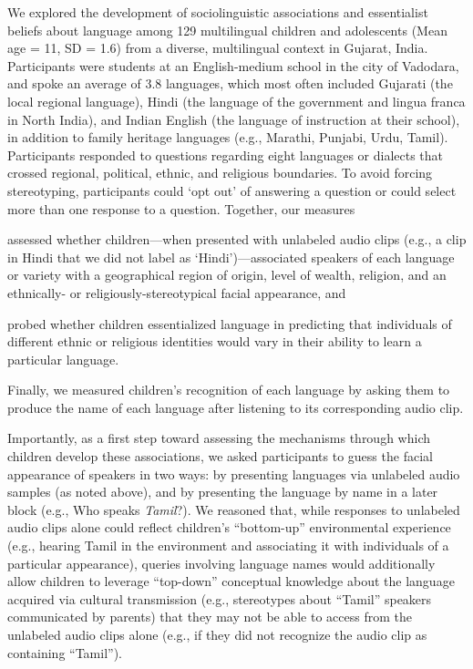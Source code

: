 \documentclass{foushee-adapted-preprint}
\begin{document}
We explored the development of sociolinguistic associations and essentialist beliefs about language among 129 multilingual children and adolescents (Mean age = 11, SD = 1.6) from a diverse, multilingual context in Gujarat, India. Participants were students at an English-medium school in the city of Vadodara, and spoke an average of 3.8 languages, which most often included Gujarati (the local regional language), Hindi (the language of the government and lingua franca in North India), and Indian English (the language of instruction at their school), in addition to family heritage languages (e.g., Marathi, Punjabi, Urdu, Tamil). 
Participants responded to questions regarding eight languages or dialects that crossed regional, political, ethnic, and religious boundaries. To avoid forcing stereotyping, participants could `opt out' of answering a question or could select more than one response to a question. Together, our measures \begin{inparaenum}[(1)]
    \item assessed whether children---when presented with unlabeled audio clips (e.g., a clip in Hindi that we did not label as `Hindi')---associated speakers of each language or variety with a geographical region of origin, level of wealth, religion, and an ethnically- or religiously-stereotypical facial appearance, and
    \item probed whether children essentialized language in predicting that individuals of different ethnic or religious identities would vary in their ability to learn a particular language.
\end{inparaenum} 
Finally, we measured children's recognition of each language by asking them to produce the name of each language after listening to its corresponding audio clip.

Importantly, as a first step toward assessing the mechanisms through which children develop these associations, we asked participants to guess the facial appearance of speakers in two ways: by presenting languages via unlabeled audio samples (as noted above), and by presenting the language by name in a later block (e.g., Who speaks \textit{Tamil}?). We reasoned that, while responses to unlabeled audio clips alone could reflect children's ``bottom-up'' environmental experience (e.g., hearing Tamil in the environment and associating it with individuals of a particular appearance), queries involving language names would additionally allow children to leverage ``top-down'' conceptual knowledge about the language acquired via cultural transmission (e.g., stereotypes about ``Tamil'' speakers communicated by parents) that they may not be able to access from the unlabeled audio clips alone (e.g., if they did not recognize the audio clip as containing ``Tamil'').
\end{document}
